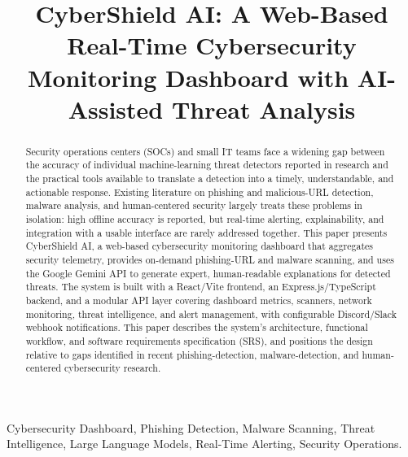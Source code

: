 \documentclass[conference]{IEEEtran}
\begin{document}
\title{CyberShield AI: A Web-Based Real-Time Cybersecurity Monitoring Dashboard with AI-Assisted Threat Analysis}

\author{
}

\maketitle

\begin{abstract}
Security operations centers (SOCs) and small IT teams face a widening gap between the accuracy of individual machine-learning threat detectors reported in research and the practical tools available to translate a detection into a timely, understandable, and actionable response. Existing literature on phishing and malicious-URL detection, malware analysis, and human-centered security largely treats these problems in isolation: high offline accuracy is reported, but real-time alerting, explainability, and integration with a usable interface are rarely addressed together. This paper presents CyberShield AI, a web-based cybersecurity monitoring dashboard that aggregates security telemetry, provides on-demand phishing-URL and malware scanning, and uses the Google Gemini API to generate expert, human-readable explanations for detected threats. The system is built with a React/Vite frontend, an Express.js/TypeScript backend, and a modular API layer covering dashboard metrics, scanners, network monitoring, threat intelligence, and alert management, with configurable Discord/Slack webhook notifications. This paper describes the system's architecture, functional workflow, and software requirements specification (SRS), and positions the design relative to gaps identified in recent phishing-detection, malware-detection, and human-centered cybersecurity research.
\end{abstract}

\begin{IEEEkeywords}
Cybersecurity Dashboard, Phishing Detection, Malware Scanning, Threat Intelligence, Large Language Models, Real-Time Alerting, Security Operations.
\end{IEEEkeywords}
\end{document}
